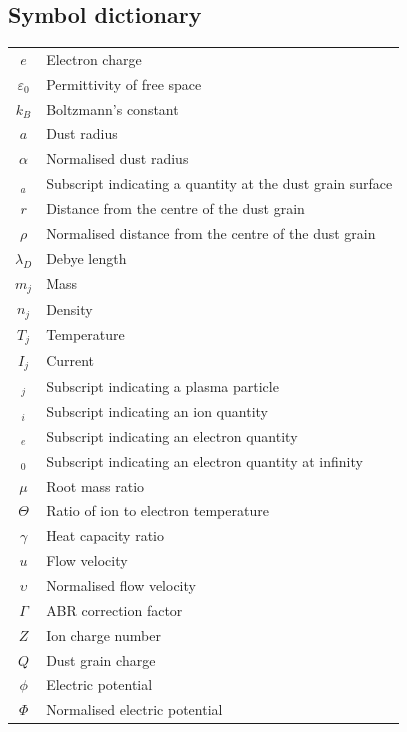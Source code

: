 \documentclass{article}
\begin{document}
\subsection{Symbol dictionary}
\begin{center}
\begin{tabular}{cl} 

$e$ & Electron charge \\
$\varepsilon_0$ & Permittivity of free space \\
$k_B$ & Boltzmann's constant \\
$a$ & Dust radius\\
$\alpha$ & Normalised dust radius \\
$_a$ & Subscript indicating a quantity at the dust grain surface \\
$r$ & Distance from the centre of the dust grain \\
$\rho$ & Normalised distance from the centre of the dust grain \\
$\lambda_D$ & Debye length \\
$m_j$ & Mass \\
$n_j$ & Density \\
$T_j$ & Temperature \\
$I_j$ & Current \\
$_j$ & Subscript indicating a plasma particle \\
$_i$ & Subscript indicating an ion quantity \\
$_e$ & Subscript indicating an electron quantity \\
$_0$ & Subscript indicating an electron quantity at infinity \\
$\mu$ & Root mass ratio\\
$\Theta$ & Ratio of ion to electron temperature \\
$\gamma$ & Heat capacity ratio \\
$u$ & Flow velocity \\
$\upsilon$ & Normalised flow velocity \\
$\Gamma$ & ABR correction factor \\
$Z$ & Ion charge number \\
$Q$ & Dust grain charge \\
$\phi$ & Electric potential \\
$\Phi$ & Normalised electric potential \\

\end{tabular}
\end{center}
\end{document}
